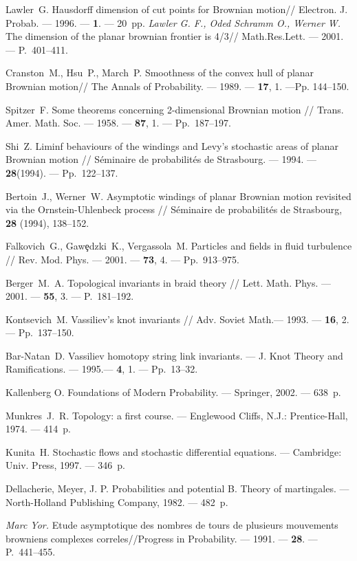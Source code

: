 \documentclass[12pt, a4paper, titlepage]{article}
\begin{document}
\begin{thebibliography}{99}

Lawler~G.
Hausdorff dimension of cut points for Brownian motion//
Electron. J. Probab. --- 1996. --- \textbf{1}. --- 20~pp. 
\textit{Lawler G. F., Oded Schramm O., Werner W.}
The dimension of the planar brownian frontier is 4/3//
Math.Res.Lett. --- 2001. --- P.~401--411.

Cranston~M., Hsu~P., March~P.
Smoothness of the convex hull of planar Brownian motion//
The Annals of Probability. ---  1989. --- \textbf{17}, 1. ---Pp. 144--150. 

Spitzer~F.
Some theorems concerning 2-dimensional Brownian motion //
Trans. Amer. Math. Soc. --- 1958. --- \textbf{87}, 1. --- Pp.~187--197.

Shi~Z.
Liminf behaviours of the windings and Levy's stochastic areas of planar Brownian motion //
S\'eminaire de probabilit\'es de Strasbourg. --- 1994. ---
\textbf{28}(1994). --- Pp.~122--137.

Bertoin~J., Werner~W.
Asymptotic windings of planar Brownian motion revisited
via the Ornstein-Uhlenbeck process //
S\'eminaire de probabilit\'es de Strasbourg,
\textbf{28}
(1994),
138--152.

Falkovich~G., Gaw\c{e}dzki~K., Vergassola~M.
Particles and fields in fluid turbulence //
Rev. Mod. Phys. --- 2001. --- \textbf{73}, 4. --- Pp.~913--975.

Berger~M.~A.
Topological invariants in braid theory //
Lett. Math. Phys. --- 2001. --- \textbf{55}, 3. --- P.~181--192. 

Kontsevich~M. Vassiliev's knot invariants //
Adv. Soviet Math.--- 1993. --- \textbf{16}, 2.  --- Pp.~137--150.

Bar-Natan~D.
Vassiliev homotopy string link invariants. --- 
J. Knot Theory and Ramifications. --- 1995.--- \textbf{4}, 1.  --- Pp.~13--32.

Kallenberg O. 
Foundations of Modern Probability. --- Springer, 2002. --- 638~p.


Munkres~J.~R.
Topology: a first course. --- Englewood Cliffs, N.J.: Prentice-Hall, 1974. --- 414~p.

Kunita~H.
Stochastic flows and stochastic differential equations. --- Cambridge: Univ. Press, 1997. --- 346~p.


Dellacherie, Meyer, J. P.
Probabilities and potential B. Theory of martingales. --- 
North-Holland Publishing Company, 1982. --- 482~p. 

 \textit{Marc Yor.} 
Etude asymptotique des nombres de tours de plusieurs mouvements browniens complexes
correles//Progress in Probability. --- 1991. --- \textbf{28}.  --- P.~441--455.

\end{thebibliography}
\end{document}
